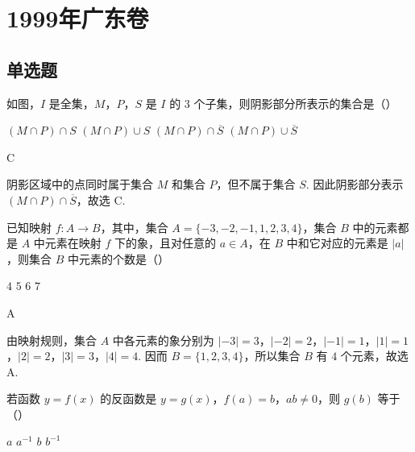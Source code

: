 \documentclass[UTF8,a4paper,oneside,11pt]{ctexbook}
\begin{document}
\mainmatter

\chapter{1999年广东卷}

\section{单选题}

\begin{problem}
如图，\(I\) 是全集，\(M\)，\(P\)，\(S\) 是 \(I\) 的 \(3\) 个子集，则阴影部分所表示的集合是（\quad）


\choices
    {\((M\cap P)\cap S\)}
    {\((M\cap P)\cup S\)}
    {\((M\cap P)\cap \overline{S}\)}
    {\((M\cap P)\cup \overline{S}\)}
\end{problem}

\begin{answer}
C
\end{answer}

\begin{solution}
阴影区域中的点同时属于集合 \(M\) 和集合 \(P\)，但不属于集合 \(S\). 因此阴影部分表示
\((M\cap P)\cap\overline{S}\)，故选 C.
\end{solution}

\begin{problem}
已知映射 \(f:A\to B\)，其中，集合 \(A=\{-3,-2,-1,1,2,3,4\}\)，集合 \(B\) 中的元素都是 \(A\) 中元素在映射 \(f\) 下的象，且对任意的 \(a\in A\)，在 \(B\) 中和它对应的元素是 \(|a|\)，则集合 \(B\) 中元素的个数是（\quad）

\choices
    {\(4\)}
    {\(5\)}
    {\(6\)}
    {\(7\)}
\end{problem}

\begin{answer}
A
\end{answer}

\begin{solution}
由映射规则，集合 \(A\) 中各元素的象分别为
\(|-3|=3\)，\(|-2|=2\)，\(|-1|=1\)，\(|1|=1\)，\(|2|=2\)，\(|3|=3\)，\(|4|=4\). 因而
\(B=\{1,2,3,4\}\)，所以集合 \(B\) 有 \(4\) 个元素，故选 A.
\end{solution}

\begin{problem}
若函数 \(y=f(x)\) 的反函数是 \(y=g(x)\)，\(f(a)=b\)，\(ab\neq 0\)，则 \(g(b)\) 等于（\quad）

\choices
    {\(a\)}
    {\(a^{-1}\)}
    {\(b\)}
    {\(b^{-1}\)}
\end{problem}
\end{document}

